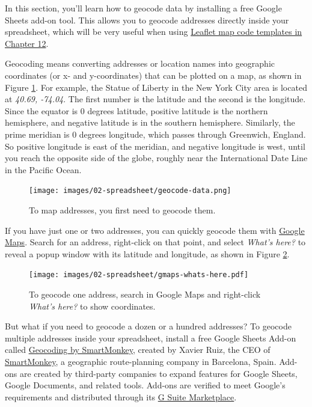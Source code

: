 \documentclass[
  english,
]{book}
\begin{document}
In this section, you'll learn how to geocode data by installing a free Google Sheets add-on tool. This allows you to geocode addresses directly inside your spreadsheet, which will be very useful when using \href{leaflet.html}{Leaflet map code templates in Chapter 12}.

Geocoding means converting addresses or location names into geographic coordinates (or x- and y-coordinates) that can be plotted on a map, as shown in Figure \ref{fig:geocode-data}. For example, the Statue of Liberty in the New York City area is located at \emph{40.69, -74.04}. The first number is the latitude and the second is the longitude. Since the equator is 0 degrees latitude, positive latitude is the northern hemisphere, and negative latitude is in the southern hemisphere. Similarly, the prime meridian is 0 degrees longitude, which passes through Greenwich, England. So positive longitude is east of the meridian, and negative longitude is west, until you reach the opposite side of the globe, roughly near the International Date Line in the Pacific Ocean.



\begin{figure}
\centering
\texttt{[image: images/02-spreadsheet/geocode-data.png]}
\caption{\label{fig:geocode-data}To map addresses, you first need to geocode them.}
\end{figure}

If you have just one or two addresses, you can quickly geocode them with \href{https://www.google.com/maps}{Google Maps}. Search for an address, right-click on that point, and select \emph{What's here?} to reveal a popup window with its latitude and longitude, as shown in Figure \ref{fig:gmaps-whats-here}.



\begin{figure}
\centering
\texttt{[image: images/02-spreadsheet/gmaps-whats-here.pdf]}
\caption{\label{fig:gmaps-whats-here}To geocode one address, search in Google Maps and right-click \emph{What's here?} to show coordinates.}
\end{figure}

But what if you need to geocode a dozen or a hundred addresses? To geocode multiple addresses inside your spreadsheet, install a free Google Sheets Add-on called \href{https://gsuite.google.com/marketplace/app/geocoding_by_smartmonkey/1033231575312}{Geocoding by SmartMonkey}, created by Xavier Ruiz, the CEO of \href{https://www.smartmonkey.io/}{SmartMonkey}, a geographic route-planning company in Barcelona, Spain. Add-ons are created by third-party companies to expand features for Google Sheets, Google Documents, and related tools. Add-ons are verified to meet Google's requirements and distributed through its \href{https://gsuite.google.com/marketplace}{G Suite Marketplace}.
\end{document}
